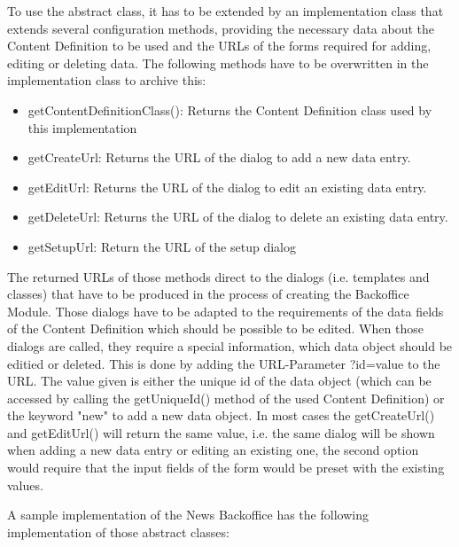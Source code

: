 To use the abstract class, it has to be extended by an implementation
class that extends several configuration methods, providing the
necessary data about the Content Definition to be used and the URLs of
the forms required for adding, editing or deleting data. The following
methods have to be overwritten in the implementation class to archive
this:
\begin{itemize}
\item getContentDefinitionClass(): Returns the Content Definition
class used by this implementation
\item getCreateUrl: Returns the URL of the dialog to add a new data
entry.
\item getEditUrl: Returns the URL of the dialog to edit an existing
data entry.
\item getDeleteUrl: Returns the URL of the dialog to delete an
existing data entry.
\item getSetupUrl: Return the URL of the setup dialog
\end{itemize}

The returned URLs of those methods direct to the dialogs (i.e. templates
and classes) that have to be produced in the process of creating the
Backoffice Module. Those dialogs have to be adapted to the requirements
of the data fields of the Content Definition which should be possible to
be edited. When those dialogs are called, they require a special
information, which data object should be editied or deleted.
This is done by adding the URL-Parameter {\code ?id=value} to the URL. The value
given is either the unique id of the data object (which can be accessed
by calling  the {\meth getUniqueId()} method of the used Content Definition) or
the keyword "new" to add a new data object.
In most cases the {\meth getCreateUrl()} and {\meth getEditUrl()} will return the same
value, i.e. the same dialog will be shown when adding a new data entry
or editing an existing one, the second option would require that the
input fields of the form would be preset with the existing values.

A sample implementation of the News Backoffice has the following
implementation of those abstract classes:

